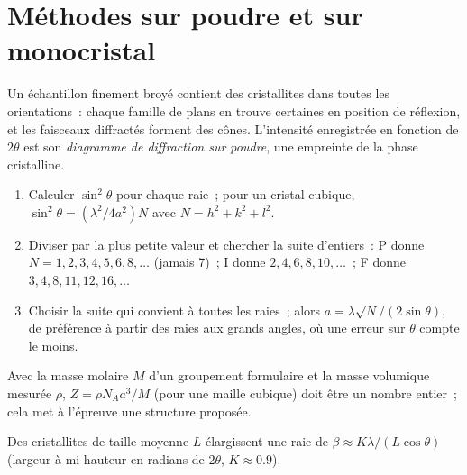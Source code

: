 \section{Méthodes sur poudre et sur monocristal}

\begin{definition}\label{def:b3:x-ray-diffraction:powder}
Un échantillon finement broyé contient des cristallites dans toutes les
orientations~: chaque famille de plans en trouve certaines en position de
réflexion, et les faisceaux diffractés forment des cônes. L'intensité
enregistrée en fonction de $2\theta$ est son \emph{diagramme de
diffraction sur poudre}, une
empreinte de la phase cristalline.
\end{definition}

\begin{method}\label{met:b3:x-ray-diffraction:index-cubic}
\begin{enumerate}
  \item Calculer $\sin^2\theta$ pour chaque raie~; pour un cristal
        cubique, $\sin^2\theta =
        (\lambda^2/4a^2)N$ avec $N = h^2 + k^2 + l^2$.
  \item Diviser par la plus petite valeur et chercher la suite
        d'entiers~: P donne
        $N = 1, 2, 3, 4, 5, 6, 8, \dots$ (jamais 7)~; I donne
        $2, 4, 6, 8, 10, \dots$~; F donne
        $3, 4, 8, 11, 12, 16, \dots$
  \item Choisir la suite qui convient à toutes les raies~; alors
        $a = \lambda\sqrt N/(2\sin\theta)$, de préférence à partir des
        raies aux grands angles, où une erreur sur $\theta$ compte le
        moins.
\end{enumerate}
\end{method}

\begin{method}\label{met:b3:x-ray-diffraction:z-from-density}
Avec la masse molaire $M$ d'un groupement formulaire et la masse
volumique mesurée $\rho$, $Z =
\rho N_Aa^3/M$ (pour une maille cubique) doit être un nombre entier~;
cela met à l'épreuve une structure proposée.
\end{method}

\begin{proposition}\label{prop:b3:x-ray-diffraction:scherrer}
Des cristallites de taille moyenne $L$ élargissent une raie de
$\beta \approx K\lambda/(L\cos\theta)$ (largeur
à mi-hauteur en radians de $2\theta$, $K \approx 0.9$).
\end{proposition}
\admitted

